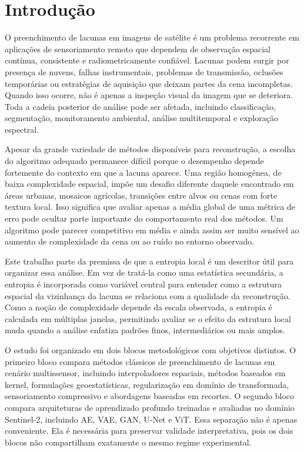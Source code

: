 \section{Introdução}
\label{sec:introduction}

O preenchimento de lacunas em imagens de satélite é um problema recorrente em aplicações de sensoriamento remoto que dependem de observação espacial contínua, consistente e radiometricamente confiável.
Lacunas podem surgir por presença de nuvens, falhas instrumentais, problemas de transmissão, oclusões temporárias ou estratégias de aquisição que deixam partes da cena incompletas.
Quando isso ocorre, não é apenas a inspeção visual da imagem que se deteriora.
Toda a cadeia posterior de análise pode ser afetada, incluindo classificação, segmentação, monitoramento ambiental, análise multitemporal e exploração espectral.

Apesar da grande variedade de métodos disponíveis para reconstrução, a escolha do algoritmo adequado permanece difícil porque o desempenho depende fortemente do contexto em que a lacuna aparece.
Uma região homogênea, de baixa complexidade espacial, impõe um desafio diferente daquele encontrado em áreas urbanas, mosaicos agrícolas, transições entre alvos ou cenas com forte textura local.
Isso significa que avaliar apenas a média global de uma métrica de erro pode ocultar parte importante do comportamento real dos métodos.
Um algoritmo pode parecer competitivo em média e ainda assim ser muito sensível ao aumento de complexidade da cena ou ao ruído no entorno observado.

Este trabalho parte da premissa de que a entropia local é um descritor útil para organizar essa análise.
Em vez de tratá-la como uma estatística secundária, a entropia é incorporada como variável central para entender como a estrutura espacial da vizinhança da lacuna se relaciona com a qualidade da reconstrução.
Como a noção de complexidade depende da escala observada, a entropia é calculada em múltiplas janelas, permitindo avaliar se o efeito da estrutura local muda quando a análise enfatiza padrões finos, intermediários ou mais amplos.

O estudo foi organizado em dois blocos metodológicos com objetivos distintos.
O primeiro bloco compara métodos clássicos de preenchimento de lacunas em cenário multissensor, incluindo interpoladores espaciais, métodos baseados em kernel, formulações geoestatísticas, regularização em domínio de transformada, sensoriamento compressivo e abordagens baseadas em recortes.
O segundo bloco compara arquiteturas de aprendizado profundo treinadas e avaliadas no domínio Sentinel-2, incluindo \gls{AE}, \gls{VAE}, \gls{GAN}, U-Net e \gls{ViT}.
Essa separação não é apenas conveniente.
Ela é necessária para preservar validade interpretativa, pois os dois blocos não compartilham exatamente o mesmo regime experimental.

